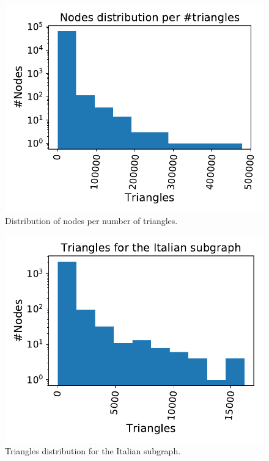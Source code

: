 \documentclass[11pt, twoside]{report}
\begin{document}
\begin{minipage}[b]{0.5\textwidth}
   \centering
    \begin{figure}[H]
      \includegraphics[width=\textwidth]{../../scripts/network_analysis/imgs/triangles_tot.pdf}            
          \caption{Distribution of nodes per number of triangles.}
      \label{fig:triangles}
\end{figure}
\end{minipage}
\begin{minipage}[b]{0.5\textwidth}
  \begin{figure}[H]
  \centering
      \includegraphics[width=\textwidth]{../../scripts/network_analysis/imgs/triangles_tot_ita.pdf}            
          \caption{ Triangles distribution for the Italian subgraph.}
\end{figure}
\end{minipage}
\end{document}
